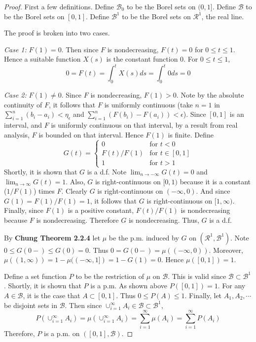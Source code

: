\documentclass[letterpaper, 12pt]{article}
\newcommand{\sB}{\mathscr{B}}
\newcommand{\sR}{\mathscr{R}}
\newcommand{\sion}{\sum_{i=1}^n}
\newcommand{\sioi}{\sum_{i=1}^\infty}
\begin{document}
\begin{proof}
First a few definitions. Define $\sB_0$ to be the Borel sets on $(0,1]$. Define $\sB$ to be the Borel sets on $[0,1]$.  Define $\sB^1$ to be the Borel sets on $\sR^1$, the real line.

The proof is broken into two cases.

\textit{Case 1:} $F(1) = 0$. Then since $F$ is nondecreasing, $F(t) = 0$ for $0 \leq t \leq 1$. Hence a suitable function $X(s)$ is the constant function $0$. For $0 \leq t \leq 1$,
\[
0 = F(t) = \int_0^t X(s) ds = \int_0^t 0 ds = 0
\]

\textit{Case 2:} $F(1) \neq 0$. Since $F$ is nondecreasing, $F(1) > 0$. Note by the absolute continuity of $F$, it follows that $F$ is uniformly continuous (take $n = 1$ in $\sion (b_i - a_i) < \eta_\epsilon$ and $\sion (F(b_i) - F(a_i)) < \epsilon$). Since $[0, 1]$ is an interval, and $F$ is uniformly continuous on that interval, by a result from real analysis, $F$ is bounded on that interval. Hence $F(1)$ is finite. Define
\[
G(t) =
\begin{cases}
0
&
\text{for $t < 0$}
\\
F(t)/F(1)
&
\text{for $t \in [0,1]$}
\\
1
&
\text{for $t > 1$}
\end{cases}
\]
Shortly, it is shown that $G$ is a d.f.
Note $\lim_{n \to -\infty} G(t) = 0$ and $\lim_{n \to \infty} G(t) = 1$. 
Also, $G$ is right-continuous on $[0,1)$ because it is a constant ($1/F(1)$) times $F$. 
Clearly $G$ is right-continuous on $(-\infty, 0)$. 
And since $G(1) = F(1)/F(1) = 1$, it follows that $G$ is right-continuous on $[1, \infty)$. 
Finally, since $F(1)$ is a positive constant, $F(t)/F(1)$ is nondecreasing because $F$ is nondecreasing. Therefore $G$ is nondecreasing. Thus, $G$ is a d.f.

By \textbf{Chung Theorem 2.2.4} let $\mu$ be the p.m. induced by $G$ on $(\sR^1,\sB^1)$.
Note $0 \leq G(0 -) \leq G(0) = 0$. Thus $ 0 = G(0-) = \mu((-\infty, 0))$. 
Moreover, $\mu((1, \infty)) = 1-\mu((-\infty, 1]) = 1 - G(1) = 0$. Hence $\mu([0,1]) = 1$.

Define a set function $P$ to be the restriction of $\mu$ on $\sB$.
This is valid since $\sB \subset \sB^1$.
Shortly, it is shown that $P$ is a p.m.
As shown above $P([0,1]) = 1$. 
For any $A \in \sB$, it is the case that $A \subset [0,1]$. Thus $0 \leq P(A) \leq 1$. Finally, let $A_1, A_2, \cdots$ be disjoint sets in $\sB$. Then since $\cup_{i=1}^\infty A_i \in \sB \subset \sB^1$,
\[
P(\cup_{i=1}^\infty A_i) =\mu(\cup_{i=1}^\infty A_i) = \sioi \mu(A_i) = \sioi P(A_i)
\]
Therefore, $P$ is a p.m. on $([0,1], \sB)$.


\end{proof}
\end{document}

